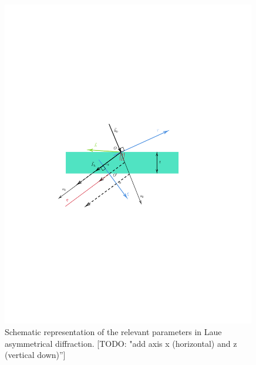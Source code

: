 \documentclass[preprint]{iucr}              %
\newcommand{\todo}[1]{{\color{red}[TODO: "#1'']}}
\begin{document}
\begin{figure}
\label{fig:laue}
\caption{Schematic representation of the relevant parameters in Laue asymmetrical diffraction. \todo{add axis x (horizontal) and z (vertical down)}
}
\includegraphics[width=0.99\textwidth,trim=3cm 10cm 5cm 10cm,clip=true]{fig3.pdf}
\end{figure}

\end{document}
